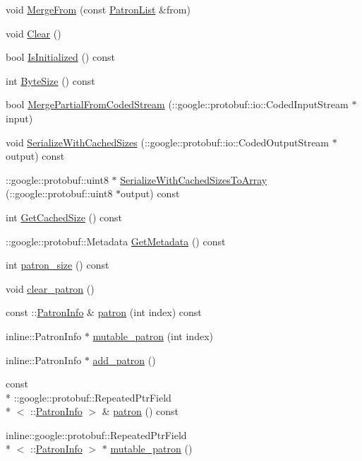 \begin{DoxyCompactItemize}
\item 
void \hyperlink{classPatronList_a8eeb8fd7415b3def55a73351d1498262}{Merge\-From} (const \hyperlink{classPatronList}{Patron\-List} \&from)
\item 
void \hyperlink{classPatronList_a7160afb214dfb8e70b2e7c05ddde66a3}{Clear} ()
\item 
bool \hyperlink{classPatronList_a308fafe3691c142b84ad3e418282642c}{Is\-Initialized} () const 
\item 
int \hyperlink{classPatronList_adeb8cc6180dcf2e757e0b037cc7aae76}{Byte\-Size} () const 
\item 
bool \hyperlink{classPatronList_a2f739c2a429500b51e38bddcf905e20c}{Merge\-Partial\-From\-Coded\-Stream} (\-::google\-::protobuf\-::io\-::\-Coded\-Input\-Stream $\ast$input)
\item 
void \hyperlink{classPatronList_a1c814b854ed199e6e5a3a9be571c0cf5}{Serialize\-With\-Cached\-Sizes} (\-::google\-::protobuf\-::io\-::\-Coded\-Output\-Stream $\ast$output) const 
\item 
\-::google\-::protobuf\-::uint8 $\ast$ \hyperlink{classPatronList_a501fbb7c45b1d4d420980cc370774d80}{Serialize\-With\-Cached\-Sizes\-To\-Array} (\-::google\-::protobuf\-::uint8 $\ast$output) const 
\item 
int \hyperlink{classPatronList_a15390935b3d8b0f36013fedacf27dad4}{Get\-Cached\-Size} () const 
\item 
\-::google\-::protobuf\-::\-Metadata \hyperlink{classPatronList_a1cb930e236fe78eda4c688f26d0fe986}{Get\-Metadata} () const 
\item 
int \hyperlink{classPatronList_a41c42f1f71cd81c9a190f5f48e5db80c}{patron\-\_\-size} () const 
\item 
void \hyperlink{classPatronList_a794b084077e58790b8684d7171f43f5c}{clear\-\_\-patron} ()
\item 
const \-::\hyperlink{classPatronInfo}{Patron\-Info} \& \hyperlink{classPatronList_a06a9c34fe448aff842b0138b4d3ffca1}{patron} (int index) const 
\item 
inline\-::\-Patron\-Info $\ast$ \hyperlink{classPatronList_a632820648c17c8ac7e45cb50017dfa54}{mutable\-\_\-patron} (int index)
\item 
inline\-::\-Patron\-Info $\ast$ \hyperlink{classPatronList_a8a40f5962be07ba62e4e651a8e55b264}{add\-\_\-patron} ()
\item 
const \\*
\-::google\-::protobuf\-::\-Repeated\-Ptr\-Field\\*
$<$ \-::\hyperlink{classPatronInfo}{Patron\-Info} $>$ \& \hyperlink{classPatronList_a17adadf414d4ab1bb0b5f41c14a99fe1}{patron} () const 
\item 
inline\-::google\-::protobuf\-::\-Repeated\-Ptr\-Field\\*
$<$ \-::\hyperlink{classPatronInfo}{Patron\-Info} $>$ $\ast$ \hyperlink{classPatronList_a0af78591f2a0c53b7e283d598f00661a}{mutable\-\_\-patron} ()
\end{DoxyCompactItemize}
